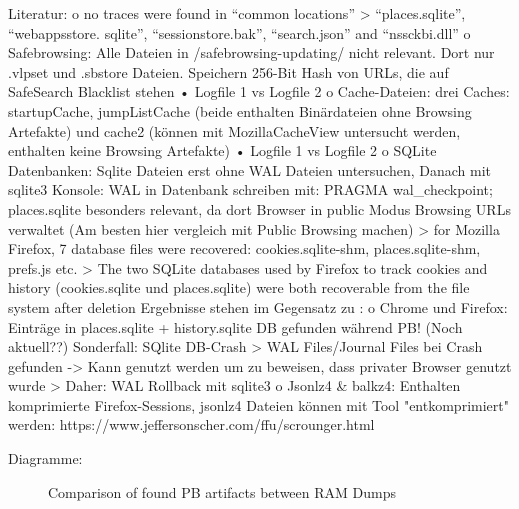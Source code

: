Literatur:
	o no traces were found in “common locations” \cite{Montasari.2015}
		>  “places.sqlite”, “webappsstore. sqlite”, “sessionstore.bak”, “search.json” and “nssckbi.dll”
	o	Safebrowsing: Alle Dateien in /safebrowsing-updating/ nicht relevant. Dort nur .vlpset und .sbstore Dateien. Speichern 256-Bit Hash von URLs, die auf SafeSearch Blacklist stehen 
		•	Logfile 1 vs Logfile 2
	o	Cache-Dateien: drei Caches: startupCache, jumpListCache (beide enthalten Binärdateien ohne Browsing Artefakte) und cache2 (können mit MozillaCacheView untersucht werden, enthalten keine Browsing Artefakte)
		•	Logfile 1 vs Logfile 2
	o	SQLite Datenbanken: Sqlite Dateien erst ohne WAL Dateien untersuchen, Danach mit sqlite3 Konsole: WAL in Datenbank schreiben mit: PRAGMA wal\_checkpoint; places.sqlite besonders relevant, da dort Browser in public Modus Browsing URLs verwaltet (Am besten hier vergleich mit Public Browsing machen)	
		> \cite{Fayyad.2021} for Mozilla Firefox, 7 database files were recovered: cookies.sqlite-shm, places.sqlite-shm, prefs.js etc.
		> \cite{Muir.2019} The two SQLite databases used by Firefox to track cookies and history (cookies.sqlite und places.sqlite) were both recoverable from the file system after deletion	
		Ergebnisse stehen im Gegensatz zu \cite{Hedberg.2013} :
			o	Chrome und Firefox: Einträge in places.sqlite + history.sqlite DB gefunden während PB! (Noch aktuell??)
		Sonderfall: SQlite DB-Crash \cite{Hedberg.2013}
			> WAL Files/Journal Files bei Crash gefunden -> Kann genutzt werden um zu beweisen, dass privater Browser genutzt wurde
			> Daher: WAL Rollback mit sqlite3	
	o	Jsonlz4 \& balkz4: Enthalten komprimierte Firefox-Sessions, jsonlz4 Dateien können mit Tool "entkomprimiert" werden: https://www.jeffersonscher.com/ffu/scrounger.html

Diagramme:
\begin{figure}[h!]
	\label{chart:final-criteria}  
	\caption{Comparison of found PB artifacts between RAM Dumps}
\end{figure}



